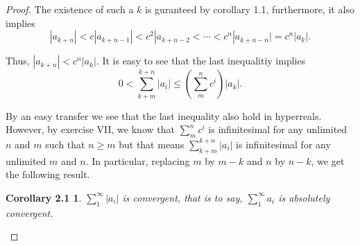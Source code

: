 \documentclass[a4paper, 11pt]{book}
\theoremstyle{plain}
\newtheorem*{corollary2.1}{Corollary 2.1}
\theoremstyle{plain}
\begin{document}
\begin{proof}
      The existence of such a $k$ is guranteed by corollary 1.1, furthermore, it also implies $$|a_{k+n}|< c |a_{k+n-1}|<c^2 |a_{k+n-2}<\cdots < c^n |a_{k+n-n}|=c^n |a_k|.$$

      Thus, $|a_{k+n}|<c^n |a_k|$. It is easy to see that the last inequalitiy implies $$0< \sum_{k+m}^{k+n} |a_i| 
      \leq \left( \sum_{m}^n c^i \right) |a_k|.$$

      By an easy transfer we see that the last inequality also hold in hyperreals. However, by exercise VII, we know that $\sum_{m}^n c^i$ is infinitesimal for any unlimited $n$ and $m$ such that $n\geq m$ but that means $\sum_{k+m}^{k+n} |a_i|$ is infinitesimal for any unlimited $m$ and $n$. In particular, replacing $m$ by $m-k$ and $n$ by $n-k$, we get the following result. 
      
      \begin{corollary2.1}
        $\sum_{1}^\infty |a_i|$ is convergent, that is to say, $\sum_{1}^\infty a_i$ is absolutely convergent.
      \end{corollary2.1}
  \end{proof}
\end{document}
